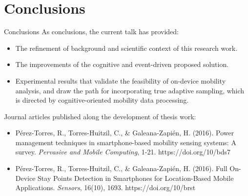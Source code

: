 \documentclass[8pt,xcolor={dvipsnames},handout]{beamer}
\begin{document}
\section{Conclusions}
\begin{frame}{Conclusions}{}
As conclusions, the current talk has provided:
\begin{itemize}
  \item The refinement of background and scientific context of this research work.
  \item The improvements of the cognitive and event-driven proposed solution.
  \item Experimental results that validate the feasibility of on-device mobility analysis, and draw the path for incorporating true adaptive sampling, which is directed by cognitive-oriented mobility data processing.
\end{itemize}

{
\vspace{2cm}
\small{}
Journal articles published along the development of thesis work:
\begin{itemize}
  \item Pérez-Torres, R., Torres-Huitzil, C., \& Galeana-Zapién, H. (2016). Power management techniques in smartphone-based mobility sensing systems: A survey. \emph{Pervasive and Mobile Computing}, 1-21. https://doi.org/10/bds7 \cite{Perez-Torres2016}

  \item Pérez-Torres, R., Torres-Huitzil, C., \& Galeana-Zapién, H. (2016). Full On-Device Stay Points Detection in Smartphones for Location-Based Mobile Applications. \emph{Sensors}, 16(10), 1693. https://doi.org/10/brst \cite{Perez-Torres2016b} 
\end{itemize}}
\end{frame}
\end{document}
